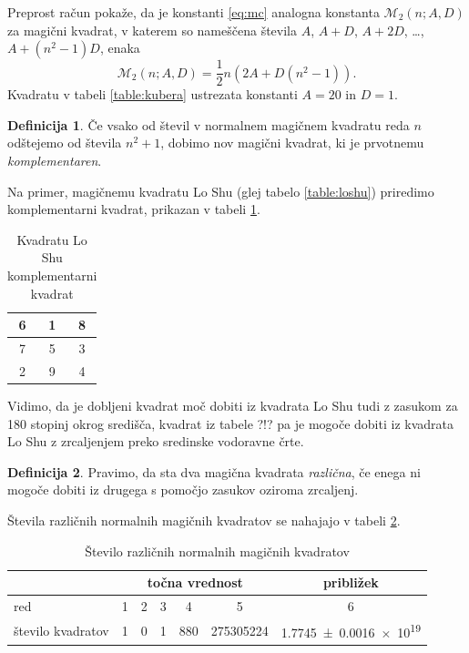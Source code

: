 \documentclass[a4paper,12pt]{article}
\newcommand{\m}{\mathcal{M}_2}
\newcommand{\pojem}[1]{\emph{\color{purple}#1}}
\newenvironment{magic}[3]
{
   \begin{table}[!ht]
   \centering
   \caption{#2}
   \label{#3}
   \large
   \begin{tabular}{|*{#1}{c|}}
   \hline
}
{
   \end{tabular}
    \normalsize
\end{table}
}
\theoremstyle{definition}
\newtheorem{definicija}{Definicija}
\theoremstyle{plain}
\begin{document}
Preprost račun pokaže, da je konstanti \eqref{eq:mc} analogna konstanta
\(\m(n;A,D)\) za magični kvadrat, v katerem so nameščena števila
\(A\), \(A+D\), \(A+2D\), \ldots, \(A+(n^2-1)D\), enaka
\[
   \m(n;A,D) = \frac{1}{2} n \left(2A+D(n^2-1)\right).
\]
Kvadratu v tabeli \ref{table:kubera} ustrezata konstanti \(A=20\) in \(D=1\). %

\begin{definicija}
   Če vsako od števil v normalnem magičnem kvadratu reda \(n\) odštejemo
   od števila \(n^2+1\), dobimo nov magični kvadrat, ki je prvotnemu
   \pojem{komplementaren}.
\end{definicija}

Na primer, magičnemu kvadratu Lo Shu (glej tabelo \ref{table:loshu}) priredimo
komplementarni kvadrat, prikazan v tabeli \ref{table:closhu}. %
%
\begin{magic}{3}{Kvadratu Lo Shu komplementarni kvadrat}{table:closhu}
   6 & 1 & 8 \\ \hline
   7 & 5 & 3 \\ \hline
   2 & 9 & 4 \\\hline
   \end{magic}

Vidimo, da je dobljeni kvadrat moč dobiti iz kvadrata Lo Shu tudi z zasukom za
180 stopinj okrog središča, kvadrat iz tabele ?!? pa je mogoče dobiti
iz kvadrata Lo Shu z zrcaljenjem preko sredinske vodoravne črte. %

\begin{definicija}
   Pravimo, da sta dva magična kvadrata \pojem{različna}, če enega ni mogoče dobiti
   iz drugega s pomočjo zasukov oziroma zrcaljenj.
\end{definicija}

Števila različnih normalnih magičnih kvadratov se nahajajo v tabeli \ref{table:stevila}.

\begin{table}[!ht]
   \centering
   \caption{Število različnih normalnih magičnih kvadratov}
   \label{table:stevila}
   \begin{tabular}{lcccccc}\toprule
      & \multicolumn{5}{c}{točna vrednost} & približek \\
      \midrule
      red & 1 & 2 & 3 & 4 & 5 & 6 \\
      število kvadratov & 1 & 0 & 1 & 880 & \num{275305224} & \num[separate-uncertainty]{1.7745 \pm 0.0016 e19} \\
      \bottomrule
   \end{tabular}
\end{table}
\end{document}
